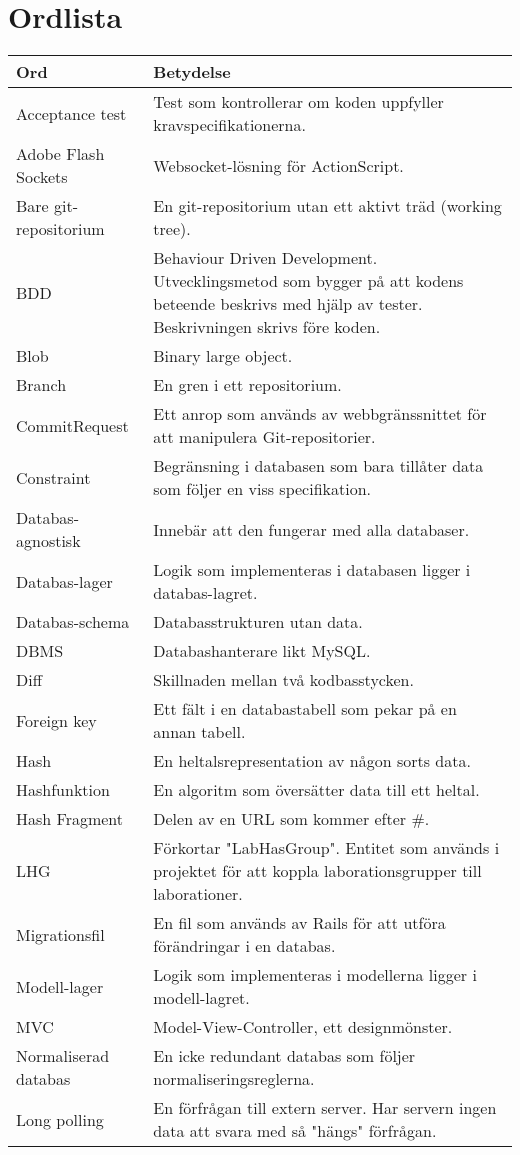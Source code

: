 \section{Ordlista}
\label{sec:ordlista}
\small
\begin{tabular} { | l | p{10cm} | }
\hline
\bf{Ord} & \bf{Betydelse} \\
\hline
Acceptance test	& Test som kontrollerar om koden uppfyller kravspecifikationerna. \\
\hline
Adobe Flash Sockets & Websocket-lösning för ActionScript. \\
\hline
Bare git-repositorium & En git-repositorium utan ett aktivt träd (working tree). \\
\hline
BDD & Behaviour Driven Development. Utvecklingsmetod som bygger på att kodens
beteende beskrivs med hjälp av tester. Beskrivningen skrivs före koden. \\
\hline
Blob & Binary large object.\\
\hline
Branch & En gren i ett repositorium. \\
\hline
CommitRequest & Ett anrop som används av webbgränssnittet för att manipulera Git-repositorier. \\
\hline
Constraint & Begränsning i databasen som bara tillåter data som följer en viss specifikation. \\
\hline
Databas-agnostisk & Innebär att den fungerar med alla databaser. \\
\hline
Databas-lager & Logik som implementeras i databasen ligger i databas-lagret. \\
\hline
Databas-schema & Databasstrukturen utan data. \\
\hline
DBMS & Databashanterare likt MySQL. \\
\hline
Diff & Skillnaden mellan två kodbasstycken. \\
\hline
Foreign key & Ett fält i en databastabell som pekar på en annan tabell. \\
\hline
Hash & En heltalsrepresentation av någon sorts data. \\
\hline
Hashfunktion & En algoritm som översätter data till ett heltal. \\
\hline
Hash Fragment & Delen av en URL som kommer efter \#. \\
\hline
LHG & Förkortar "LabHasGroup". Entitet som används i projektet för att koppla laborationsgrupper till laborationer. \\
\hline
Migrationsfil & En fil som används av Rails för att utföra förändringar i en databas. \\
\hline
Modell-lager & Logik som implementeras i modellerna ligger i modell-lagret. \\
\hline
MVC & Model-View-Controller, ett designmönster. \\
\hline
Normaliserad databas & En icke redundant databas som följer normaliseringsreglerna. \\
\hline
Long polling & En förfrågan till extern server. Har servern ingen data att svara med så "hängs" förfrågan. \\
\hline
\end{tabular}

